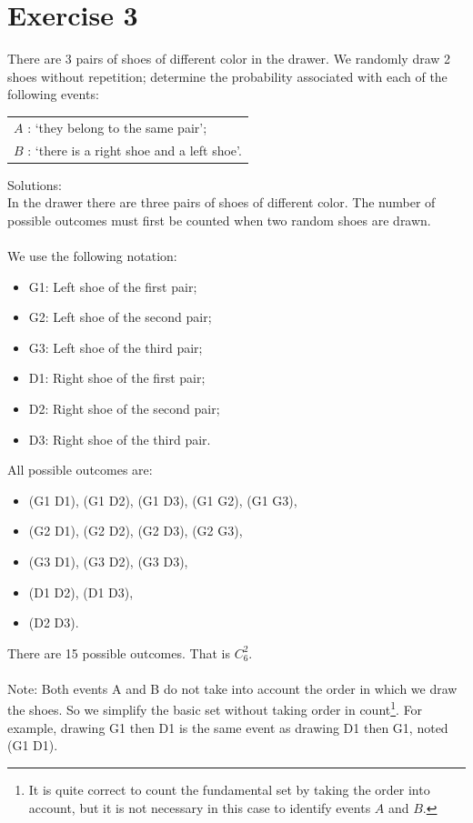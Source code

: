 \documentclass[12pt,thmsa]{article}\usepackage[]{graphicx}\usepackage[]{color}
\begin{document}
\section*{Exercise 3}
There are 3 pairs of shoes of different color in the drawer. We randomly draw 2 shoes without repetition;
determine the probability associated with each of the following events:

 \begin{center}
 \begin{tabular}{l}
 $A$ : `they belong to the same pair';  \\
 $B$ : `there is a right shoe and a left shoe'.
 \end{tabular}
 \end{center}

\noindent Solutions:\\
In the drawer there are three pairs of shoes of different color. The number of possible outcomes must first be counted when two random shoes are drawn.\\
\\
We use the following notation:
\begin{itemize}
\item G1: Left shoe of the first pair;
\item G2: Left shoe of the second pair;
\item G3: Left shoe of the third pair;
\item D1: Right shoe of the first pair;
\item D2: Right shoe of the second pair;
\item D3: Right shoe of the third pair.
\end{itemize}
\medskip
All possible outcomes are:
\begin{itemize}
\item (G1 D1), (G1 D2), (G1 D3), (G1 G2), (G1 G3),
\item (G2 D1), (G2 D2), (G2 D3), (G2 G3),
\item (G3 D1), (G3 D2), (G3 D3),
\item (D1 D2), (D1 D3),
\item (D2 D3).
\end{itemize}
\medskip
There are 15 possible outcomes. That is $C^{2}_{6}$.\\
\\
Note:
Both events A and B do not take into account the order in which we
draw the shoes. So we simplify the basic set without taking order in count\footnote{It is quite correct to count the fundamental set by taking the order into account, but it is not necessary in this case to identify events $A$ and $B$.}. For example, drawing G1 then D1 is the same event as drawing D1 then G1, noted (G1 D1).\\
\newpage
\end{document}
